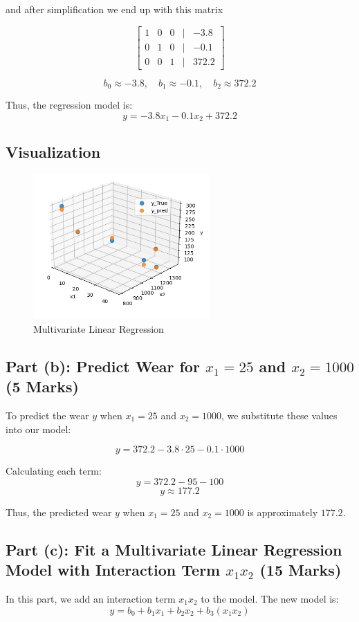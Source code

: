 \documentclass{article}
\begin{document}
	and after simplification we end up with this matrix
	
	\[
	\begin{bmatrix}
		1 & 0 & 0 & \vert & -3.8\\
		0 & 1 & 0 & \vert & -0.1\\
		0 & 0 & 1 & \vert & 372.2
	\end{bmatrix}
	\]
	
	\[
	b_0 \approx -3.8, \quad b_1 \approx -0.1, \quad b_2 \approx 372.2
	\]
	
	Thus, the regression model is:
	\[
	y = - 3.8 x_1 - 0.1 x_2 + 372.2
	\]
	
	\subsection*{Visualization} 
	\begin{figure}[h!]
		\centering
		\includegraphics[width=0.6\textwidth]{./images/task2a_output.png}
		\caption{Multivariate Linear Regression}
		\label{fig:image2}
	\end{figure}
	
	
	\subsection*{Part (b): Predict Wear for \( x_1 = 25 \) and \( x_2 = 1000 \) (5 Marks)}
	To predict the wear \( y \) when \( x_1 = 25 \) and \( x_2 = 1000 \), we substitute these values into our model:
	
	\[
	y = 372.2 - 3.8 \cdot 25 - 0.1 \cdot 1000
	\]
	
	Calculating each term:
	\[
	y = 372.2 - 95 - 100
	\]
	\[
	y \approx 177.2
	\]
	
	Thus, the predicted wear \( y \) when \( x_1 = 25 \) and \( x_2 = 1000 \) is approximately \( 177.2 \).
	
	 \subsection*{Part (c): Fit a Multivariate Linear Regression Model with Interaction Term \( x_1 x_2 \) (15 Marks)}
	In this part, we add an interaction term \( x_1 x_2 \) to the model. The new model is:
	\[
	y = b_0 + b_1 x_1 + b_2 x_2 + b_3 (x_1 x_2)
	\]
	
\end{document}
